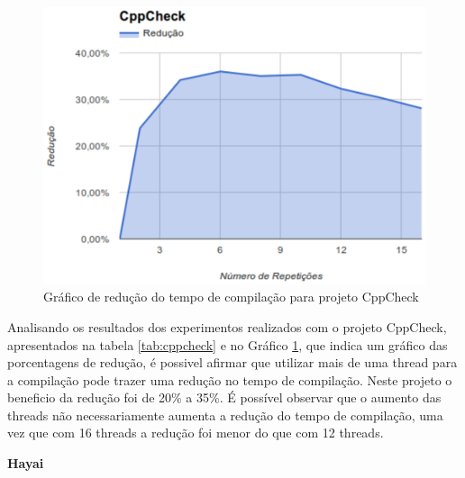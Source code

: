\begin{figure}[h]
    \centering
        \includegraphics[keepaspectratio=true,scale=1]{figuras/cppcheck.eps}
    \caption{Gráfico de redução do tempo de compilação para projeto CppCheck}
    \label{cppcheck}
\end{figure}

Analisando os resultados dos experimentos realizados com o projeto
 CppCheck, apresentados na tabela \ref{tab:cppcheck} e no Gráfico \ref{cppcheck},
 que indica um gráfico das porcentagens de redução, é
 possivel afirmar que utilizar mais de uma thread para a
 compilação pode trazer uma redução no tempo de compilação.
 Neste projeto o beneficio da redução foi de 20\% a 35\%.
 É possível observar que o aumento das threads  não
 necessariamente aumenta a redução do tempo de compilação,
 uma vez que com 16 threads  a redução foi menor  do que com 12 threads.


\textbf{Hayai}


